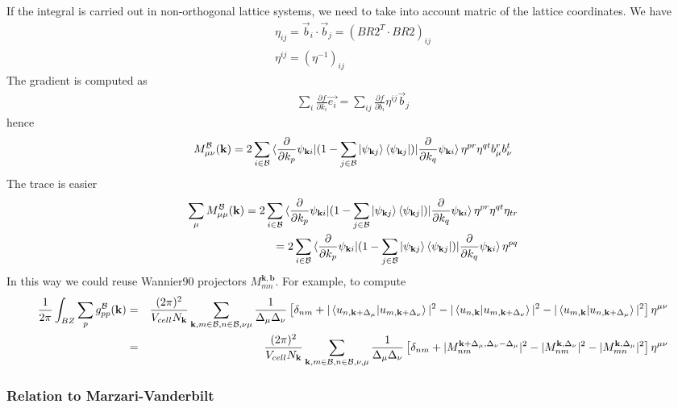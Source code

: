 \documentclass[onecolumn, prb,preprintnumbers,amsmath,amssymb,floatfix]{revtex4}
\newcommand{\vk}{{\mathbf{k}}}
\newcommand{\vb}{{\mathbf{b}}}
\newcommand{\cb}{{\cal B}}
\begin{document}
If the integral is carried out in non-orthogonal lattice systems, we need to take into account matric of the lattice coordinates. We have
\begin{eqnarray}
  \eta_{ij}=\vec{b}_i \cdot \vec{b}_j = (BR2^T\cdot BR2)_{ij}\\
  \eta^{ij} = \left(\eta^{-1}\right)_{ij}
\end{eqnarray}
The gradient is computed as
\begin{eqnarray}
\sum_i \frac{\partial f}{\partial k_i} \vec{e_i}= \sum_{ij}\frac{\partial f}{\partial b_i}\eta^{ij} \vec{b}_j  
\end{eqnarray}
hence
\begin{eqnarray}
 M_{\mu\nu}^{\cb}(\vk)  =2\sum_{i\in \cb}
   \braket{\frac{\partial}{\partial k_{p}}\psi_{\vk i}|(1-\sum_{j\in \cb}\ket{\psi_{\vk j}}\bra{\psi_{\vk j}})|\frac{\partial}{\partial k_{q}}\psi_{\vk i}}\eta^{p r}\eta^{q t} b^{r}_{\mu} b^t_{\nu}
\end{eqnarray}
The trace is easier
\begin{eqnarray}
 \sum_{\mu}M_{\mu\mu}^{\cb}(\vk)  =2\sum_{i\in \cb}
   \braket{\frac{\partial}{\partial k_{p}}\psi_{\vk i}|(1-\sum_{j\in \cb}\ket{\psi_{\vk j}}\bra{\psi_{\vk j}})|\frac{\partial}{\partial k_{q}}\psi_{\vk i}}\eta^{p r}\eta^{q t} \eta_{t r}\\
=2\sum_{i\in \cb}
   \braket{\frac{\partial}{\partial k_{p}}\psi_{\vk i}|(1-\sum_{j\in \cb}\ket{\psi_{\vk j}}\bra{\psi_{\vk j}})|\frac{\partial}{\partial k_{q}}\psi_{\vk i}}\eta^{p q}
\end{eqnarray}
In this way we could reuse Wannier90 projectors $M_{mn}^{\vk,\vb}$.
For example, to compute 
\begin{eqnarray}
\frac{1}{2\pi}\int_{BZ} \sum_{p} g^{\cb}_{pp}(\vk) &=&   
\frac{(2\pi)^2}{ V_{cell}N_\vk}\sum_{\vk,m\in\cb,n\in\cb,\nu\mu}\frac{1}{\Delta_\mu\Delta_\nu}
  \left[
    \delta_{nm} 
    +|\braket{u_{n,\vk+\Delta_\mu}|u_{m,\vk+\Delta_\nu}}|^2 
    -|\braket{u_{n,\vk} |u_{m,\vk+\Delta_\nu}}|^2
    -|\braket{u_{m,\vk} |u_{n,\vk+\Delta_\mu}}|^2
  \right]\eta^{\mu\nu}
\nonumber\\
&=&\frac{(2\pi)^2}{ V_{cell}N_\vk}\sum_{\vk,m\in\cb,n\in\cb,\nu,\mu}\frac{1}{\Delta_\mu\Delta_\nu}
  \left[
    \delta_{nm} 
    +|M_{nm}^{\vk+\Delta_\mu,\Delta_\nu-\Delta_{\mu}}|^2 
    -|M_{nm}^{\vk,\Delta_\nu}|^2
    -|M_{mn}^{\vk,\Delta_\mu}|^2
  \right]\eta^{\mu\nu}
\end{eqnarray}

\subsubsection{Relation to Marzari-Vanderbilt}
\end{document}
